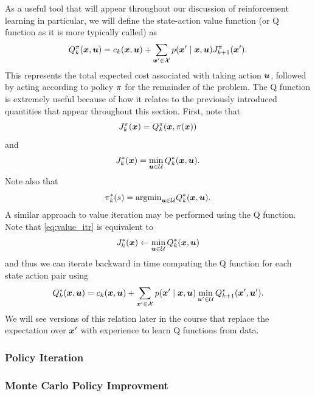 As a useful tool that will appear throughout our discussion of reinforcement learning in particular, we will define the state-action value function (or Q function as it is more typically called) as 
\begin{equation}
    Q^{\pi}_k(\bm{x}, \bm{u}) = c_k(\bm{x}, \bm{u}) + \sum_{\bm{x}' \in \mathcal{X}} p(\bm{x}' \mid \bm{x}, \bm{u}) J^{\pi}_{k+1}(\bm{x}').
\end{equation}
This represents the total expected cost associated with taking action $\bm{u}$, followed by acting according to policy $\pi$ for the remainder of the problem. The Q function is extremely useful because of how it relates to the previously introduced quantities that appear throughout this section. First, note that 
\begin{equation}
    J^\pi_k(\bm{x}) = Q^{\pi}_k(\bm{x}, \pi(\bm{x}))
\end{equation}
and 
\begin{equation}
    J^*_k(\bm{x}) = \min_{\bm{u} \in \mathcal{U}} Q^{*}_k(\bm{x}, \bm{u}).
\end{equation}
Note also that 
\begin{equation}
    \pi^*_k(s) = \text{argmin}_{\bm{u} \in \mathcal{U}} Q^{*}_k(\bm{x}, \bm{u}).
\end{equation}
A similar approach to value iteration may be performed using the Q function. Note that \eqref{eq:value_itr} is equivalent to 
\begin{equation}
    J^*_k(\bm{x}) \gets \min_{\bm{u} \in \mathcal{U}} Q^*_k(\bm{x}, \bm{u})
\end{equation}
and thus we can iterate backward in time computing the Q function for each state action pair using 
\begin{equation}
    Q^{*}_k(\bm{x}, \bm{u}) = c_k(\bm{x}, \bm{u}) + \sum_{\bm{x}' \in \mathcal{X}} p(\bm{x}' \mid \bm{x}, \bm{u}) \min_{\bm{u}' \in \mathcal{U}}  Q^{*}_{k+1}(\bm{x}', \bm{u}').
\end{equation}
We will see versions of this relation later in the course that replace the expectation over $\bm{x}'$ with experience to learn Q functions from data. 


\subsubsection{Policy Iteration}


\subsubsection{Monte Carlo Policy Improvment}

